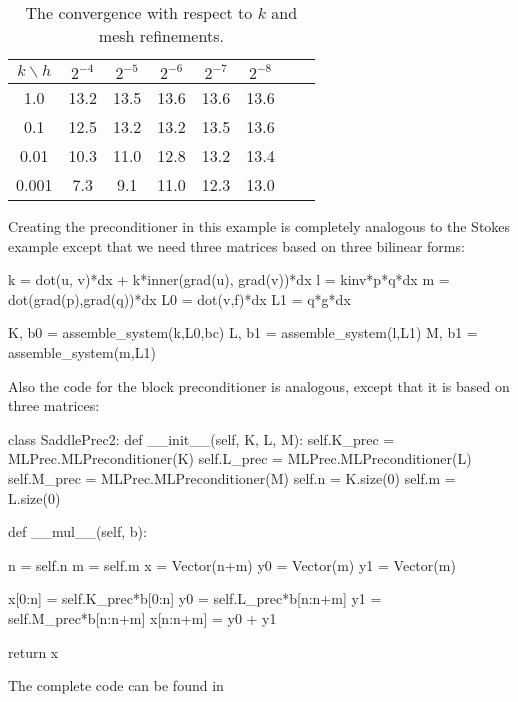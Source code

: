 \begin{table}
\begin{center}
\begin{tabular}{|c|c||c|c|c|c|c|c|}
\hline
$k\backslash h$ & $2^{-4}$ & $2^{-5}$ & $2^{-6}$ & $2^{-7}$ & $2^{-8}$ \\ \hline\hline
1.0 & 13.2 & 13.5 & 13.6 & 13.6 & 13.6 \\ \hline 
0.1 & 12.5 & 13.2 & 13.2 & 13.5 & 13.6 \\ \hline 
0.01 & 10.3 & 11.0 & 12.8 & 13.2 & 13.4 \\ \hline 
0.001 & 7.3 & 9.1 & 11.0 & 12.3  & 13.0 \\ \hline 
\end{tabular}
\caption{The  convergence with respect to $k$ and mesh refinements.}\label{timestokes:ex} 
\end{center}
\end{table}

Creating the preconditioner in this example is completely analogous to the Stokes
example except that we need three matrices based on three bilinear forms: 
\begin{code}
k = dot(u, v)*dx +  k*inner(grad(u), grad(v))*dx 
l = kinv*p*q*dx 
m = dot(grad(p),grad(q))*dx 
L0 = dot(v,f)*dx 
L1 = q*g*dx 

K, b0 = assemble_system(k,L0,bc)
L, b1 = assemble_system(l,L1)
M, b1 = assemble_system(m,L1)
\end{code}
Also the code for the block preconditioner is analogous, except that
it is based on three matrices: 
\begin{code}
class SaddlePrec2: 
    def __init__(self, K, L, M):  
        self.K_prec = MLPrec.MLPreconditioner(K)
        self.L_prec = MLPrec.MLPreconditioner(L)
        self.M_prec = MLPrec.MLPreconditioner(M)
        self.n = K.size(0)
        self.m = L.size(0)

    def __mul__(self, b):

        n = self.n
        m = self.m
        x = Vector(n+m)
        y0 = Vector(m)
        y1 = Vector(m)

        x[0:n]    = self.K_prec*b[0:n]
        y0        = self.L_prec*b[n:n+m] 
        y1        = self.M_prec*b[n:n+m] 
        x[n:n+m]   = y0 + y1  

        return x 
\end{code}
The complete code can be found in 

